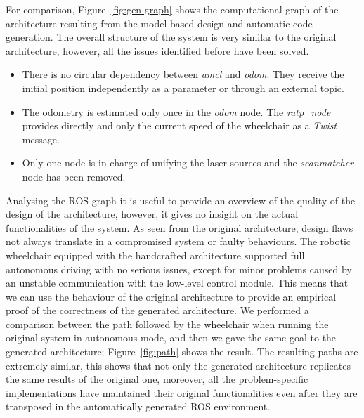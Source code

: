 For comparison, Figure~\ref{fig:gen-graph} shows the computational graph of the architecture resulting from the model-based design and automatic code generation. The overall structure of the system is very similar to the original architecture, however, all the issues identified before have been solved.
\begin{itemize}
\item There is no circular dependency between \textit{amcl} and \textit{odom}. They receive the initial position independently as a parameter or through an external topic.
\item The odometry is estimated only once in the \textit{odom} node. The \textit{ratp\_node} provides directly and only the current speed of the wheelchair as a \textit{Twist} message.
\item Only one node is in charge of unifying the laser sources and the \textit{scanmatcher} node has been removed.
\end{itemize}

Analysing the ROS graph it is useful to provide an overview of the quality of the design of the architecture, however, it gives no insight on the actual functionalities of the system. As seen from the original architecture, design flaws not always translate in a compromised system or faulty behaviours. The robotic wheelchair equipped with the handcrafted architecture supported full autonomous driving with no serious issues, except for minor problems caused by an unstable communication with the low-level control module. This means that we can use the behaviour of the original architecture  to provide an empirical proof of the correctness of the generated architecture. We performed a comparison between the path followed by the wheelchair when running the original system in autonomous mode, and then we gave the same goal to the generated architecture; Figure~\ref{fig:path} shows the result. The resulting paths are extremely similar, this shows that not only the generated architecture replicates the same results of the original one, moreover, all the problem-specific implementations have maintained their original functionalities even after they are transposed in the automatically generated ROS environment.

